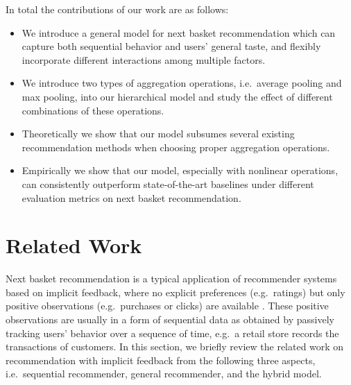 \documentclass[10pt,journal,compsoc]{IEEEtran}
\begin{document}
In total the contributions of our work are as follows:
 \begin{itemize}
 \item We introduce a general model for next basket recommendation which can capture both sequential behavior and users' general taste, and flexibly incorporate different interactions among multiple factors.
 \item We introduce two types of aggregation operations, i.e.~average pooling and max pooling, into our hierarchical model and study the effect of different combinations of these operations.
 \item Theoretically we show that our model subsumes several existing recommendation methods when choosing proper aggregation operations.
 \item Empirically we show that our model, especially with nonlinear operations, can consistently outperform state-of-the-art baselines under different evaluation metrics on next basket recommendation.
 \end{itemize}

\section{Related Work}
Next basket recommendation is a typical application of recommender systems based on implicit feedback, where no explicit preferences (e.g.~ratings) but only positive observations (e.g.~purchases or clicks) are available \cite{collaborative_improved,workshop_prob_pref}. These positive observations are usually in a form of sequential data as obtained by passively tracking users' behavior over a sequence of time, e.g.~a retail store records the transactions of customers. In this section, we briefly review the related work on recommendation with implicit feedback from the following three aspects, i.e.~sequential recommender, general recommender, and the hybrid model.
\end{document}
